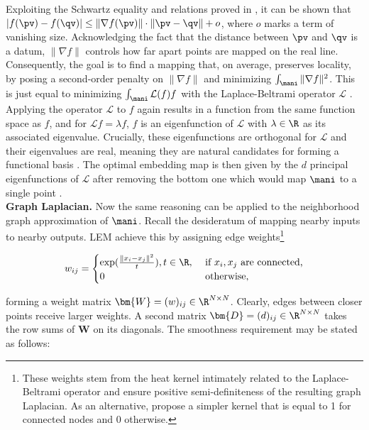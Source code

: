 \vspace{0.5cm}

Exploiting the Schwartz equality and relations proved in 
\citet{belkinniyogi2008}, it
can be shown that 
$|f(\pv) - f(\qv)| \leq \| \nabla f(\pv) \| \cdot \| \pv - \qv\| + o$, where 
$o$ marks a term of vanishing size. 
Acknowledging the fact that the distance between $\pv$ and $\qv$ is a datum,
$\| \nabla f \|$ controls how far apart points are mapped on the real line.
Consequently, the goal is to find a mapping that, on average, preserves 
locality, by posing a second-order penalty on $\| \nabla f \|$ and minimizing $\int_{\mani}\| \nabla f \|^2$.
This is just equal to minimizing $\int_{\mani} \mathcal{L}(f)f$ with the 
Laplace-Beltrami operator $\mathcal{L}$ \citep{belkinniyogi2003}.
Applying the operator $\mathcal{L}$ to $f$ again results in a function from the 
same function space as $f$, and for $\mathcal{L} f = \lambda f$, $f$ is an 
eigenfunction of $\mathcal{L}$ with $\lambda \in \R$ as its associated 
eigenvalue.
Crucially, these eigenfunctions are orthogonal for $\mathcal{L}$ and their  
eigenvalues are real, meaning they are natural candidates for forming a 
functional basis \citep{levy2006}.
The optimal embedding map is then given by the $d$ principal eigenfunctions of
$\mathcal{L}$ after removing the bottom one which would map $\mani$ to a 
single point \citep{belkinniyogi2003}.
\\

\textbf{Graph Laplacian.}
Now the same reasoning can be applied to the neighborhood graph approximation of
$\mani$.
Recall the desideratum of mapping nearby inputs to nearby 
outputs.
LEM achieve this by assigning edge weights\footnote{
These weights stem from the heat kernel intimately related to the 
Laplace-Beltrami operator and ensure positive semi-definiteness of the resulting
graph Laplacian. 
As an alternative, \citet{belkinniyogi2003} propose a simpler kernel that is 
equal to 1 for connected nodes and 0 otherwise.
}

\begin{equation*}
  w_{ij} = \begin{cases}
    \exp(\frac{\|x_i - x_j \|^2}{t}), t \in \R, & \mbox{ if } x_i, x_j  
    \text{ are connected,} \\
    0 & \mbox{ otherwise,}
  \end{cases}
\end{equation*}

forming a weight matrix $\bm{W} = (w)_{ij} \in \R^{N \times N}$.
Clearly, edges between closer points receive larger weights.
A second matrix $\bm{D} = (d)_{ij} \in \R^{N \times N}$ takes the row sums of
$\bm{W}$ on its diagonals.
The smoothness requirement may be stated as follows:


